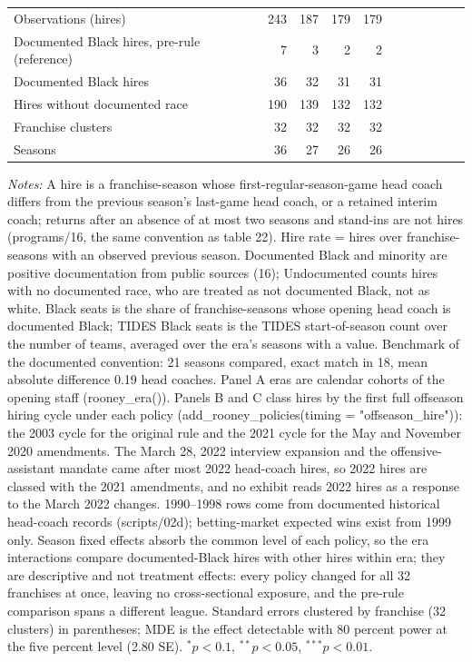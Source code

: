 \begin{table}[H]
{\begin{tabular}{lrrrrrrrrrr}
Observations (hires) & 243 & 187 & 179 & 179 & & & & & & \\
Documented Black hires, pre-rule (reference) & 7 & 3 & 2 & 2 & & & & & & \\
Documented Black hires & 36 & 32 & 31 & 31 & & & & & & \\
Hires without documented race & 190 & 139 & 132 & 132 & & & & & & \\
Franchise clusters & 32 & 32 & 32 & 32 & & & & & & \\
Seasons & 36 & 27 & 26 & 26 & & & & & & \\
\bottomrule
\end{tabular}
}
\par\smallskip
\begin{minipage}{\textwidth}
\footnotesize
\textit{Notes:} A hire is a franchise-season whose first-regular-season-game head coach differs from the previous season's last-game head coach, or a retained interim coach; returns after an absence of at most two seasons and stand-ins are not hires (programs/16, the same convention as table 22). Hire rate = hires over franchise-seasons with an observed previous season. Documented Black and minority are positive documentation from public sources (16); Undocumented counts hires with no documented race, who are treated as not documented Black, not as white. Black seats is the share of franchise-seasons whose opening head coach is documented Black; TIDES Black seats is the TIDES start-of-season count over the number of teams, averaged over the era's seasons with a value. Benchmark of the documented convention: 21 seasons compared, exact match in 18, mean absolute difference 0.19 head coaches. Panel A eras are calendar cohorts of the opening staff (rooney\_era()). Panels B and C class hires by the first full offseason hiring cycle under each policy (add\_rooney\_policies(timing = "offseason\_hire")): the 2003 cycle for the original rule and the 2021 cycle for the May and November 2020 amendments. The March 28, 2022 interview expansion and the offensive-assistant mandate came after most 2022 head-coach hires, so 2022 hires are classed with the 2021 amendments, and no exhibit reads 2022 hires as a response to the March 2022 changes. 1990--1998 rows come from documented historical head-coach records (scripts/02d); betting-market expected wins exist from 1999 only. Season fixed effects absorb the common level of each policy, so the era interactions compare documented-Black hires with other hires within era; they are descriptive and not treatment effects: every policy changed for all 32 franchises at once, leaving no cross-sectional exposure, and the pre-rule comparison spans a different league. Standard errors clustered by franchise (32 clusters) in parentheses; MDE is the effect detectable with 80 percent power at the five percent level (2.80 SE). $^{*}p<0.1$, $^{**}p<0.05$, $^{***}p<0.01$.
\end{minipage}
\end{table}
